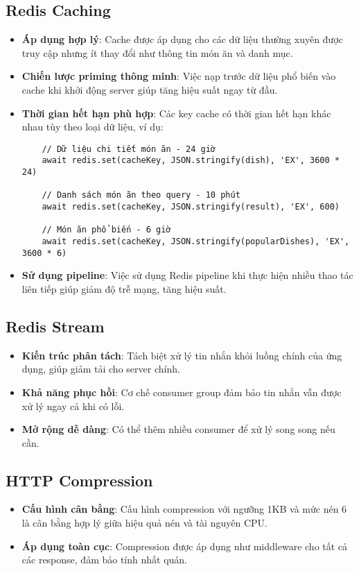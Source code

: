 \subsection{Redis Caching}
\begin{itemize}
    \item \textbf{Áp dụng hợp lý}: Cache được áp dụng cho các dữ liệu thường xuyên được truy cập nhưng ít thay đổi như thông tin món ăn và danh mục.
    \item \textbf{Chiến lược priming thông minh}: Việc nạp trước dữ liệu phổ biến vào cache khi khởi động server giúp tăng hiệu suất ngay từ đầu.
    \item \textbf{Thời gian hết hạn phù hợp}: Các key cache có thời gian hết hạn khác nhau tùy theo loại dữ liệu, ví dụ:
    \begin{verbatim}
    // Dữ liệu chi tiết món ăn - 24 giờ
    await redis.set(cacheKey, JSON.stringify(dish), 'EX', 3600 * 24)
    
    // Danh sách món ăn theo query - 10 phút
    await redis.set(cacheKey, JSON.stringify(result), 'EX', 600)
    
    // Món ăn phổ biến - 6 giờ
    await redis.set(cacheKey, JSON.stringify(popularDishes), 'EX', 3600 * 6)
    \end{verbatim}
    \item \textbf{Sử dụng pipeline}: Việc sử dụng Redis pipeline khi thực hiện nhiều thao tác liên tiếp giúp giảm độ trễ mạng, tăng hiệu suất.
\end{itemize}

\subsection{Redis Stream}
\begin{itemize}
    \item \textbf{Kiến trúc phân tách}: Tách biệt xử lý tin nhắn khỏi luồng chính của ứng dụng, giúp giảm tải cho server chính.
    \item \textbf{Khả năng phục hồi}: Cơ chế consumer group đảm bảo tin nhắn vẫn được xử lý ngay cả khi có lỗi.
    \item \textbf{Mở rộng dễ dàng}: Có thể thêm nhiều consumer để xử lý song song nếu cần.
\end{itemize}

\subsection{HTTP Compression}
\begin{itemize}
    \item \textbf{Cấu hình cân bằng}: Cấu hình compression với ngưỡng 1KB và mức nén 6 là cân bằng hợp lý giữa hiệu quả nén và tài nguyên CPU.
    \item \textbf{Áp dụng toàn cục}: Compression được áp dụng như middleware cho tất cả các response, đảm bảo tính nhất quán.
\end{itemize}

